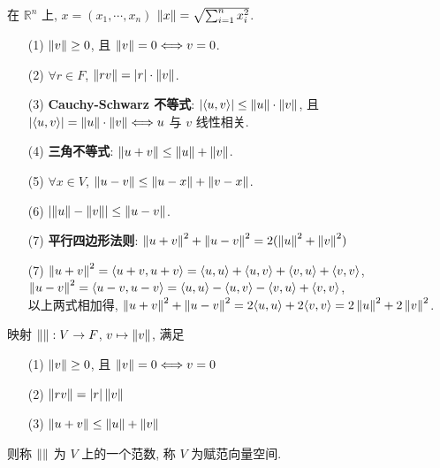 \documentclass{note}
\begin{document}
\begin{eg}
    在 $\mathbb{R}^n$ 上, $x=(x_1,\cdots,x_n)$ $\left\lVert x\right\rVert=\sqrt{\sum_{i=1}^nx_i^2}$.
\end{eg}

\begin{thm}
    \begin{itemize}
        \item[(1)] $\left\lVert v\right\rVert\geq 0$, 且 $\left\lVert v\right\rVert=0\Longleftrightarrow v=0$.
        \item[(2)] $\forall r\in F$, $\left\lVert rv\right\rVert=\left\lvert r\right\rvert\cdot\left\lVert v\right\rVert$.
        \item[(3)] \textbf{Cauchy-Schwarz 不等式}: $\left\lvert\langle u,v\rangle\right\rvert\leq\left\lVert u\right\rVert\cdot\left\lVert v\right\rVert$, 且 $\left\lvert\langle u,v\rangle\right\rvert=\left\lVert u\right\rVert\cdot\left\lVert v\right\rVert\Longleftrightarrow u$ 与 $v$ 线性相关.
        \item[(4)] \textbf{三角不等式}: $\left\lVert u+v\right\rVert\leq\left\lVert u\right\rVert+\left\lVert v\right\rVert$.
        \item[(5)] $\forall x\in V$, $\left\lVert u-v\right\rVert\leq\left\lVert u-x\right\rVert+\left\lVert v-x\right\rVert$.
        \item[(6)] $\left\lvert\left\lVert u\right\rVert-\left\lVert v\right\rVert\right\rvert\leq\left\lVert u-v\right\rVert$.
        \item[(7)] \textbf{平行四边形法则}: $\left\lVert u+v\right\rVert^2+\left\lVert u-v\right\rVert^2=2(\left\lVert u\right\rVert^2+\left\lVert v\right\rVert^2)$
    \end{itemize}
\end{thm}
\begin{pf}
    \begin{itemize}
        \item[(7)] $\left\lVert u+v\right\rVert^2=\langle u+v,u+v\rangle=\langle u,u\rangle+\langle u,v\rangle+\langle v,u\rangle+\langle v,v\rangle$, $\left\lVert u-v\right\rVert^2=\langle u-v,u-v\rangle=\langle u,u\rangle-\langle u,v\rangle-\langle v,u\rangle+\langle v,v\rangle$,\\
        以上两式相加得, $\left\lVert u+v\right\rVert^2+\left\lVert u-v\right\rVert^2=2\langle u,u\rangle+2\langle v,v\rangle=2\left\lVert u\right\rVert^2+2\left\lVert v\right\rVert^2$.
    \end{itemize}
\end{pf}

\begin{df}[范数和赋范向量空间]
    映射 $\left\lVert\right\rVert:V\rightarrow F$, $v\mapsto\left\lVert v\right\rVert$, 满足
    \begin{itemize}
        \item[(1)] $\left\lVert v\right\rVert\geq 0$, 且 $\left\lVert v\right\rVert=0\Longleftrightarrow v=0$
        \item[(2)] $\left\lVert rv\right\rVert=\left\lvert r\right\rvert\left\lVert v\right\rVert$
        \item[(3)] $\left\lVert u+v\right\rVert\leq\left\lVert u\right\rVert+\left\lVert v\right\rVert$
    \end{itemize}
    则称 $\left\lVert\right\rVert$ 为 $V$ 上的一个范数, 称 $V$ 为赋范向量空间.
\end{df}
\end{document}
